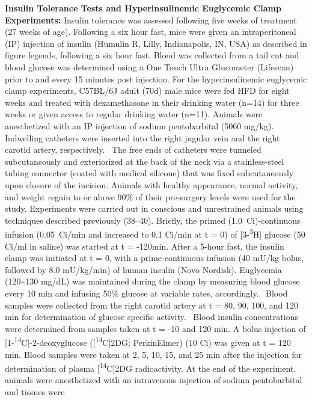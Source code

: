 \documentclass[11pt]{article} %
\begin{document}
\textbf{Insulin Tolerance Tests and Hyperinsulinemic Euglycemic Clamp
Experiments:} Insulin tolerance was assessed following five weeks of
treatment (27 weeks of age). Following a six hour fast, mice were given
an intraperitoneal (IP) injection of insulin (Humulin R, Lilly,
Indianapolis, IN, USA) as described in figure legends, following a six
hour fast. Blood was collected from a tail cut and blood glucose was
determined using a One Touch Ultra Glucometer (Lifescan) prior to and
every 15 minutes post injection. For the hyperinsulinemic euglycemic
clamp experiments, C57BL/6J adult (70d) male mice were fed HFD for eight
weeks and treated with dexamethasone in their drinking water (n=14) for
three weeks or given access to regular drinking water (n=11). Animals
were anesthetized with an IP injection of sodium pentobarbital (5060
mg/kg). Indwelling catheters were inserted into the right jugular vein
and the right carotid artery, respectively.~ The free ends of catheters
were tunneled subcutaneously and exteriorized at the back of the neck
via a stainless-steel tubing connector (coated with medical silicone)
that was fixed subcutaneously upon closure of the incision. Animals with
healthy appearance, normal activity, and weight regain to or above 90\%
of their pre-surgery levels were used for the study. Experiments were
carried out in conscious and unrestrained animals using techniques
described previously (38--40). Briefly, the primed (1.0~Ci)-continuous
infusion (0.05~Ci/min and increased to 0.1 Ci/min at t = 0) of
{[}3-\textsuperscript{3}H{]} glucose (50 Ci/ml in saline) was started
at t = -120min. After a 5-hour fast, the insulin clamp was initiated at
t = 0, with a prime-continuous infusion (40 mU/kg bolus, followed by 8.0
mU/kg/min) of human insulin (Novo Nordisk). Euglycemia
(120\textasciitilde{}130 mg/dL) was maintained during the clamp by
measuring blood glucose every 10 min and infusing 50\% glucose at
variable rates, accordingly.~ Blood samples were collected from the
right carotid artery at t = 80, 90, 100, and 120 min for determination
of glucose specific activity.~ Blood insulin concentrations were
determined from samples taken at t = -10 and 120 min. A bolus injection
of {[}1-\textsuperscript{14}C{]}-2-deoxyglucose
({[}\textsuperscript{14}C{]}2DG; PerkinElmer) (10 Ci) was given at t =
120 min. Blood samples were taken at 2, 5, 10, 15, and 25 min after the
injection for determination of plasma {[}\textsuperscript{14}C{]}2DG
radioactivity. At the end of the experiment, animals were anesthetized
with an intravenous injection of sodium pentobarbital and tissues were
\end{document}
